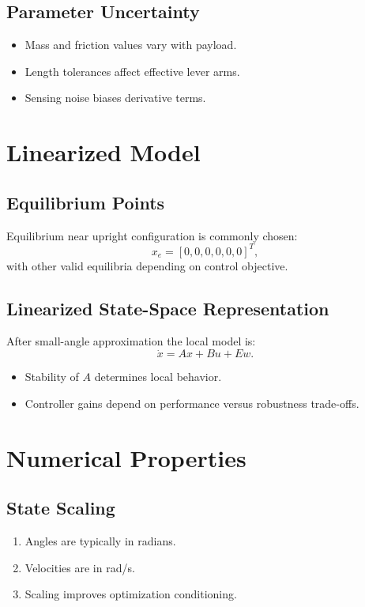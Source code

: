 \documentclass[11pt,a4paper]{article}
\begin{document}
\subsection{Parameter Uncertainty}
\begin{itemize}
    \item Mass and friction values vary with payload.
    \item Length tolerances affect effective lever arms.
    \item Sensing noise biases derivative terms.
\end{itemize}

\section{Linearized Model}

\subsection{Equilibrium Points}
Equilibrium near upright configuration is commonly chosen:
\begin{equation}
    x_e = [0,0,0,0,0,0]^T,
\end{equation}
with other valid equilibria depending on control objective.

\subsection{Linearized State-Space Representation}
After small-angle approximation the local model is:
\begin{equation}
    \dot x = A x + B u + E w.
\end{equation}
\begin{itemize}
    \item Stability of $A$ determines local behavior.
    \item Controller gains depend on performance versus robustness trade-offs.
\end{itemize}

\section{Numerical Properties}

\subsection{State Scaling}
\begin{enumerate}
    \item Angles are typically in radians.
    \item Velocities are in rad/s.
    \item Scaling improves optimization conditioning.
\end{enumerate}
\end{document}
